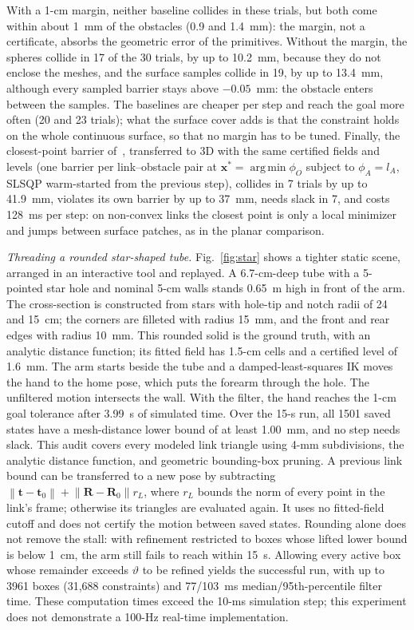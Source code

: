 \documentclass[journal]{IEEEtran}
\theoremstyle{definition}
\newcommand{\norm}[1]{\left\lVert #1\right\rVert}
\newcommand{\Rot}{\mathbf{R}}
\DeclareMathOperator*{\argmin}{arg\,min}
\begin{document}
With a 1-cm margin, neither baseline collides in these trials, but both come within about 1~mm of
the obstacles (0.9 and 1.4~mm): the margin, not a certificate, absorbs the geometric error of the
primitives. Without the margin, the spheres collide in 17 of the 30 trials, by up to 10.2~mm,
because they do not enclose the meshes, and the surface samples collide in 19, by up to 13.4~mm,
although every sampled barrier stays above $-0.05$~mm: the obstacle enters between the samples. The baselines are
cheaper per step and reach the goal more often (20 and 23 trials); what the surface cover adds is
that the constraint holds on the whole continuous surface, so that no margin has to be tuned.
Finally, the closest-point barrier of~\cite{jo2026geometry}, transferred to 3D with the same
certified fields and levels (one barrier per link--obstacle pair at
$\mathbf x^\ast=\argmin\phi_O$ subject to $\phi_A=l_A$, SLSQP warm-started from the previous step),
collides in 7 trials by up to 41.9~mm, violates its own barrier by up to 37~mm, needs slack in 7, and
costs 128~ms per step:
on non-convex links the closest point is only a local minimizer and jumps between surface patches,
as in the planar comparison.

\emph{Threading a rounded star-shaped tube.} Fig.~\ref{fig:star} shows a tighter static scene,
arranged in an interactive tool and replayed. A 6.7-cm-deep tube with a 5-pointed star hole and
nominal 5-cm walls stands 0.65~m high in front of the arm. The cross-section is constructed from
stars with hole-tip and notch radii of 24 and 15~cm; the corners are filleted with radius 15~mm,
and the front and rear edges with radius 10~mm. This rounded solid is the ground truth, with an
analytic distance function; its fitted field has 1.5-cm cells and a certified level of 1.6~mm.
The arm starts beside the tube and a damped-least-squares IK moves the hand to the home pose,
which puts the forearm through the hole. The unfiltered motion intersects the wall.
With the filter, the hand reaches the 1-cm goal tolerance after 3.99~s of simulated time.
Over the 15-s run, all 1501 saved states have a mesh-distance lower bound of at least 1.00~mm,
and no step needs slack. This audit covers every modeled link triangle using 4-mm subdivisions,
the analytic distance function, and geometric bounding-box pruning. A previous link bound can
be transferred to a new pose by subtracting
$\norm{\mathbf t-\mathbf t_0}+\norm{\Rot-\Rot_0}r_L$, where $r_L$ bounds the norm of every
point in the link's frame; otherwise its triangles are evaluated again. It uses no fitted-field
cutoff and does not certify the motion between saved states.
Rounding alone does not remove the stall: with refinement restricted
to boxes whose lifted lower bound is below 1~cm, the arm still fails to reach within 15~s.
Allowing every active box whose remainder exceeds $\vartheta$ to be refined yields the successful
run, with up to 3961 boxes (31{,}688 constraints) and 77/103~ms median/95th-percentile filter time.
These computation times exceed the 10-ms simulation step; this experiment does not demonstrate
a 100-Hz real-time implementation.
\end{document}
